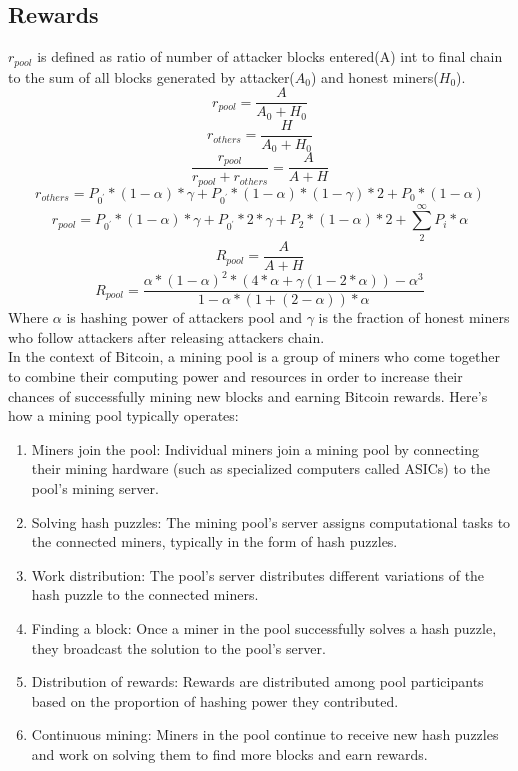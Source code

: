 \documentclass{article}
\begin{document}
\subsection{Rewards}
$r_{pool}$ is defined as ratio of number of attacker blocks entered(A) int to final chain to the sum of all blocks generated by attacker($A_0$) and honest miners($H_0$). \\
$$r_{pool} = \frac{A}{A_0 + H_0}$$
$$r_{others} = \frac{H}{A_0 + H_0}$$
$$\frac{r_{pool}}{r_{pool}+r_{others}} = \frac{A}{A + H}$$
$$r_{others} = P_{0^{'}}*(1-\alpha)*\gamma + P_{0^{'}}*(1-\alpha)*(1-\gamma)*2 + P_{0}*(1-\alpha)$$
$$r_{pool} = P_{0^{'}}*(1-\alpha)*\gamma + P_{0^{'}}*2*\gamma + P_{2}*(1-\alpha)*2 + \sum_{2}^{\infty}P_{i}*\alpha$$
$$R_{pool} = \frac{A}{A + H}$$
$$R_{pool} = \frac{\alpha*(1-\alpha)^{2}*(4*\alpha + \gamma(1-2*\alpha))-\alpha^{3}}{1-\alpha*(1+(2-\alpha))*\alpha}$$
Where $\alpha$ is hashing power of attackers pool and $\gamma$ is the fraction of honest miners who follow attackers after releasing attackers chain. \\
In the context of Bitcoin, a mining pool is a group of miners who come together to combine their computing power and resources in order to increase their chances of successfully mining new blocks and earning Bitcoin rewards. Here's how a mining pool typically operates:
\begin{enumerate}
\item Miners join the pool: Individual miners join a mining pool by connecting their mining hardware (such as specialized computers called ASICs) to the pool's mining server.

\item Solving hash puzzles: The mining pool's server assigns computational tasks to the connected miners, typically in the form of hash puzzles.

\item Work distribution: The pool's server distributes different variations of the hash puzzle to the connected miners.

\item Finding a block: Once a miner in the pool successfully solves a hash puzzle, they broadcast the solution to the pool's server.

\item Distribution of rewards: Rewards are distributed among pool participants based on the proportion of hashing power they contributed.

\item Continuous mining: Miners in the pool continue to receive new hash puzzles and work on solving them to find more blocks and earn rewards.
\end{enumerate}
\end{document}
